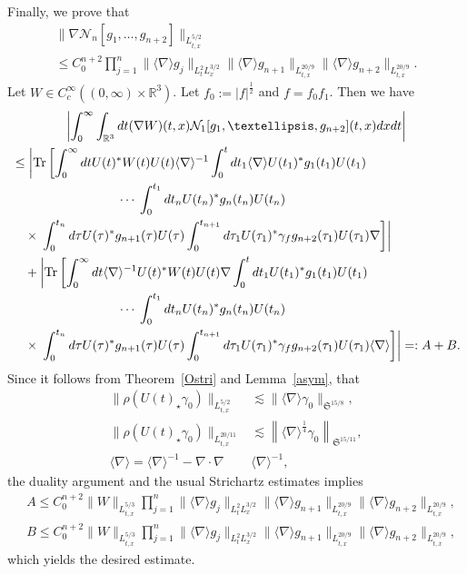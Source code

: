 \documentclass[10pt,a4paper]{amsart}
\newcommand{\BR}{\mathbb{R}}
\newcommand{\CN}{\mathcal{N}}
\newcommand{\FS}{\mathfrak{S}}
\newcommand{\ga}{\gamma}
\newcommand{\ta}{\tau}
\newcommand{\rh}{\rho}
\newcommand{\abs}[1]{\left|#1\right|}
\newcommand{\I}{\infty}
\DeclareMathOperator{\Tr}{Tr}
\newcommand{\sd}{\langle \nabla \rangle}
\newcommand{\sdi}{\sd^{-1}}
\newcommand{\tx}{{t,x}}
\newcommand{\st}{\star}
\newcommand{\ft}{{\frac{1}{4}}}
\newcommand{\R}{\mathbb{R}}
\newcommand{\tw}{\frac{1}{2}}
\newcommand{\na}{\nabla}
\newcommand{\ls}{\lesssim}
\begin{document}
Finally, we prove that
\begin{multline}\label{eq:with deriv}
\|\na \CN_n[g_1,\dots,g_{n+2}]\|_{L^{5/2}_\tx}
\\
\le C_0^{n+2} \prod_{j=1}^{n} \|\sd g_j\|_{L^2_t L^{3/2}_x} \|\sd g_{n+1}\|_{L^{20/9}_\tx} \|\sd g_{n+2}\|_{L^{20/9}_\tx}.
\end{multline}
Let $W \in C_c^\I((0,\I)\times \BR^3)$. Let $f_0 := |f|^\tw$ and $f = f_0 f_1$. Then we have
\begin{multline}
\abs{\int_0^\I \int_{\R^3} dt (\na W)(t,x) \CN_1 [g_1,\dots,g_{n+2}](t,x) dx dt } \\
\begin{aligned}
&\le \left| \Tr \left[\int_0^\I dt U(t)^* W(t) U(t) \sdi
\int_0^tdt_1 \sd U(t_1)^* g_1(t_1) U(t_1)\right.\right.
\\
&\mkern150mu\cdots\left.\left.
\int_0^{t_1} dt_n U(t_n)^* g_n(t_n) U(t_n)
\right. \right. \\
&\quad \times\left. \left.
\int_0^{t_n} d\ta U(\ta)^* g_{n+1}(\ta) U(\ta)
\int_0^{t_{n+1}} d\ta_1 U(\ta_1)^* \ga_f g_{n+2}(\ta_1) U(\ta_1)\na \right] \right| \\
&\quad + \left| \Tr \left[\int_0^\I dt \sdi U(t)^* W(t) U(t)
\na \int_0^tdt_1 U(t_1)^* g_1(t_1) U(t_1)\right.\right.\\
&\mkern150mu\cdots\left.\left.
\int_0^{t_1} dt_n U(t_n)^* g_n(t_n) U(t_n)
\right. \right. \\
&\quad\times\left. \left. 
\int_0^{t_n} d\ta U(\ta)^* g_{n+1}(\ta) U(\ta)
\int_0^{t_{n+1}} d\ta_1 U(\ta_1)^* \ga_f g_{n+2}(\ta_1) U(\ta_1)\sd \right] \right|=:A + B.
\end{aligned}
\end{multline}
Since it follows from Theorem~\ref{Ostri} and Lemma~\ref{asym}, that
\begin{align}
\|\rh(U(t)_\st \ga_0)\|_{L^{5/2}_\tx} &\ls \|\sd \ga_0\|_{\FS^{15/8}}, \\
\|\rh(U(t)_\st \ga_0)\|_{L^{20/11}_\tx} &\ls \left\|\sd^{\ft} \ga_0\right\|_{\FS^{15/11}}, \\
\sd = \sdi - \na\cdot\na &\sdi,
\end{align}
the duality argument and the usual Strichartz estimates implies
\begin{align}
&A \le C_0^{n+2} \|W\|_{L^{5/3}_\tx}\prod_{j=1}^{n} \|\sd g_j\|_{L^2_t L^{3/2}_x} \|\sd g_{n+1}\|_{L^{20/9}_\tx} \|\sd g_{n+2}\|_{L^{20/9}_\tx}, \\
&B \le C_0^{n+2} \|W\|_{L^{5/3}_\tx} \prod_{j=1}^{n} \|\sd g_j\|_{L^2_t L^{3/2}_x} \|\sd g_{n+1}\|_{L^{20/9}_\tx} \|\sd g_{n+2}\|_{L^{20/9}_\tx},
\end{align}
which yields the desired estimate.
\end{document}
